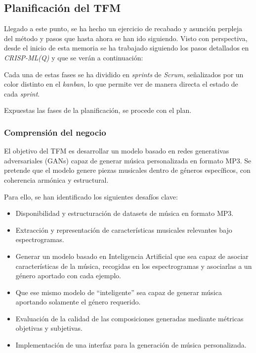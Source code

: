 \subsection{Planificación del TFM}

Llegado a este punto, se ha hecho un ejercicio de recabado y asunción perpleja del método y pasos que hasta ahora se han ido siguiendo. Visto con perspectiva, desde el inicio de esta memoria se ha trabajado siguiendo los pasos detallados en \emph{CRISP-ML(Q)} y que se verán a continuación:


Cada una de estas fases se ha dividido en \emph{sprints} de \emph{Scrum}, señalizados por un color distinto en el \emph{kanban}, lo que permite ver de manera directa el estado de cada \emph{sprint}.

Expuestas las fases de la planificación, se procede con el plan.

\subsubsection{Comprensión del negocio}

El objetivo del TFM es desarrollar un modelo basado en redes generativas adversariales (GANs) capaz de generar música personalizada en formato MP3. Se pretende que el modelo genere piezas musicales dentro de géneros específicos, con coherencia armónica y estructural.

Para ello, se han identificado los siguientes desafíos clave:
\begin{itemize}
    \item Disponibilidad y estructuración de datasets de música en formato MP3.
    \item Extracción y representación de características musicales relevantes bajo espectrogramas.
    \item Generar un modelo basado en Inteligencia Artificial que sea capaz de asociar características de la música, recogidas en los espectrogramas y asociarlas a un género aportado con cada ejemplo.
    \item Que ese mismo modelo de ``inteligente'' sea capaz de generar música aportando solamente el género requerido.
    \item Evaluación de la calidad de las composiciones generadas mediante métricas objetivas y subjetivas.
    \item Implementación de una interfaz para la generación de música personalizada.
\end{itemize}

